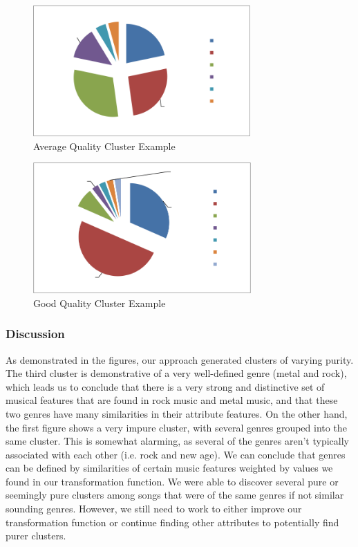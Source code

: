 \documentclass{article}
\begin{document}
\begin{figure}[H]
\begin{adjustbox}{minipage=\fboxrule,bgcolor=gray, frame}
    \centering
	\includegraphics[width=\textwidth, height = 50mm]{../images/c9.png}
\caption{Average Quality Cluster Example}
\label{average}
\end{adjustbox}
\end{figure}

\begin{figure}[H]
\begin{adjustbox}{minipage=\fboxrule,bgcolor=gray, frame}
    \centering
	\includegraphics[width=\textwidth, height = 50mm]{../images/c12.png}
\caption{Good Quality Cluster Example}
\label{good}
\end{adjustbox}
\end{figure}

\subsubsection{Discussion}
As demonstrated in the figures, our approach generated clusters of varying
purity. The third cluster is demonstrative of a very well-defined genre (metal
and rock), which leads us to conclude that there is a very strong and
distinctive set of musical features that are found in rock music and metal
music, and that these two genres have many similarities in their attribute features.
On the other hand, the first figure shows a very impure cluster, with several
genres grouped into the same cluster. This is somewhat alarming, as several of
the genres aren't typically associated with each other (i.e. rock and new age).
We can conclude that genres can be defined by similarities of certain music
features weighted by values we found in our transformation function. We were
able to discover several pure or seemingly pure clusters among songs that were
of the same genres if not similar sounding genres. However, we still need to
work to either improve our transformation function or continue finding other
attributes to potentially find purer clusters.
\end{document}

